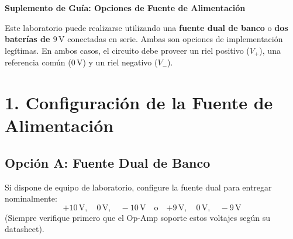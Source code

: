 \documentclass[11pt, a4paper]{article}
\begin{document}
\begin{center}
    \Large\textbf{\textcolor{ucbblue}{Suplemento de Guía: Opciones de Fuente de Alimentación}}
\end{center}

\begin{tcolorbox}[colback=yellow!5, colframe=ucbblue, title=\textbf{Opciones de Fuente de Alimentación}]
    Este laboratorio puede realizarse utilizando una \textbf{fuente dual de banco} o \textbf{dos baterías de $9\,\text{V}$} conectadas en serie. Ambas son opciones de implementación legítimas. En ambos casos, el circuito debe proveer un riel positivo ($V_+$), una referencia común ($0\,\text{V}$) y un riel negativo ($V_-$).
\end{tcolorbox}

\section*{1. Configuración de la Fuente de Alimentación}

\subsection*{Opción A: Fuente Dual de Banco}
Si dispone de equipo de laboratorio, configure la fuente dual para entregar nominalmente:
\begin{equation*}
    \boxed{+10\,\text{V}, \quad 0\,\text{V}, \quad -10\,\text{V}} \quad \text{o} \quad \boxed{+9\,\text{V}, \quad 0\,\text{V}, \quad -9\,\text{V}} \text{}
\end{equation*}
(Siempre verifique primero que el Op-Amp soporte estos voltajes según su datasheet).
\end{document}
